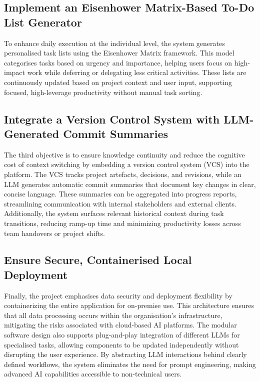 \documentclass{report}
\begin{document}
\subsection{Implement an Eisenhower Matrix-Based To-Do List Generator}
To enhance daily execution at the individual level, the system generates personalised task lists using the Eisenhower Matrix framework. This model categorises tasks based on urgency and importance, helping users focus on high-impact work while deferring or delegating less critical activities. These lists are continuously updated based on project context and user input, supporting focused, high-leverage productivity without manual task sorting.
\subsection{Integrate a Version Control System with LLM-Generated Commit Summaries}
The third objective is to ensure knowledge continuity and reduce the cognitive cost of context switching by embedding a version control system (VCS) into the platform. The VCS tracks project artefacts, decisions, and revisions, while an LLM generates automatic commit summaries that document key changes in clear, concise language. These summaries can be aggregated into progress reports, streamlining communication with internal stakeholders and external clients. Additionally, the system surfaces relevant historical context during task transitions, reducing ramp-up time and minimizing productivity losses across team handovers or project shifts.
\subsection{Ensure Secure, Containerised Local Deployment}
Finally, the project emphasises data security and deployment flexibility by containerizing the entire application for on-premise use. This architecture ensures that all data processing occurs within the organisation's infrastructure, mitigating the risks associated with cloud-based AI platforms. The modular software design also supports plug-and-play integration of different LLMs for specialised tasks, allowing components to be updated independently without disrupting the user experience. By abstracting LLM interactions behind clearly defined workflows, the system eliminates the need for prompt engineering, making advanced AI capabilities accessible to non-technical users.
\end{document}
